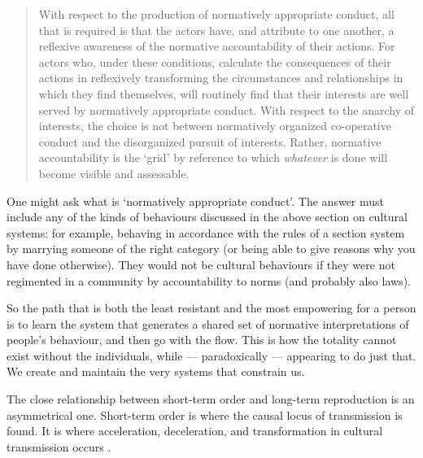\begin{quotation}
With respect to the production of normatively appropriate conduct, all 
that is required is that the actors have, and attribute to one another, 
a reflexive awareness of the normative accountability of their actions. 
For actors who, under these conditions, calculate the consequences of 
their actions in reflexively transforming the circumstances and 
relationships in which they find themselves, will routinely find that 
their interests are well served by normatively appropriate conduct. With 
respect to the anarchy of interests, the choice is not between 
normatively organized co-operative conduct and the disorganized pursuit 
of interests. Rather, normative accountability is the \textquoteleft grid' by 
reference to which \textit{whatever} is done will become visible and 
assessable. \citep[117]{heritage_garfinkel_1984}
\end{quotation}



One might ask what is \textquoteleft normatively appropriate conduct'. The answer must 
include any of the kinds of behaviours discussed in the above section on 
cultural systems: for example, behaving in accordance with the rules of 
a section system by marrying someone of the right category (or being 
able to give reasons why you have done otherwise). They would 
not be cultural behaviours if they were not regimented in a community by 
accountability to norms (and probably also laws). 



So the path that is both the least resistant and the most empowering for 
a person is to learn the system that generates a shared set of 
normative interpretations of people's behaviour, and then go with the 
flow. This is how the totality cannot exist without the individuals, 
while --- paradoxically --- appearing to do just that. We create and maintain the very systems that constrain us.



The close relationship between short-term order and long-term 
reproduction is an asymmetrical one. Short-term order is where the 
causal locus of transmission is found. It is where acceleration, 
deceleration, and transformation in cultural transmission occurs 
\citep{schelling_micromotives_1978,rogers_diffusion_2003,sperber_anthropology_1985,sperber_explaining_1996}. 



